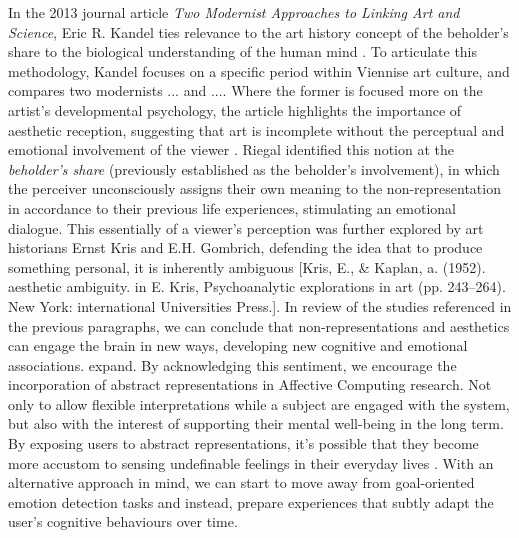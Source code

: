In the 2013 journal article \textit{Two Modernist Approaches to Linking Art and Science}, Eric R. Kandel ties relevance to the art history concept of the beholder's share to the biological understanding of the human mind \cite{kandel_two_2013}. To articulate this methodology, Kandel focuses on a specific period within Viennise art culture, and compares two modernists ... and .... Where the former is focused more on the artist's developmental psychology, the article highlights the importance of aesthetic reception, suggesting that art is incomplete without the perceptual and emotional involvement of the viewer \cite{riegl_group_1999}. Riegal identified this notion at the \textit{beholder's share} (previously established as the beholder's involvement), in which the perceiver unconsciously assigns their own meaning to the non-representation in accordance to their previous life experiences, stimulating an emotional dialogue. This essentially of a viewer's perception was further explored by art historians Ernst Kris and E.H. Gombrich, defending the idea that to produce something personal, it is inherently ambiguous [Kris, E., \& Kaplan, a. (1952). aesthetic ambiguity. in E. Kris, Psychoanalytic explorations in art (pp. 243–264). New York: international Universities Press.]. 
In review of the studies referenced in the previous paragraphs, we can conclude that non-representations and aesthetics can engage the brain in new ways, developing new cognitive and emotional associations. {\color{red}expand}. By acknowledging this sentiment, we encourage the incorporation of abstract representations in Affective Computing research. Not only to allow flexible interpretations while a subject are engaged with the system, but also with the interest of supporting their mental well-being in the long term. By exposing users to abstract representations, it's possible that they become more accustom to sensing undefinable feelings in their everyday lives \cite{durkin_objective_2020}. With an alternative approach in mind, we can start to move away from goal-oriented emotion detection tasks and instead, prepare experiences that subtly adapt the user's cognitive behaviours over time. 

\newpage

